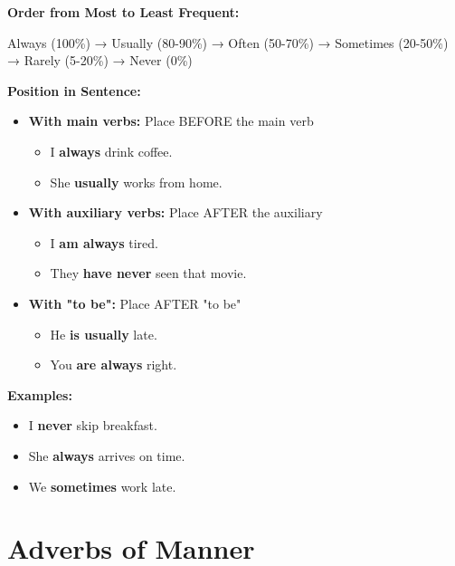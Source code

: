 \begin{grammarbox}[title=Adverbs of Frequency]
\textbf{Order from Most to Least Frequent:}
\begin{center}
Always (100\%) → Usually (80-90\%) → Often (50-70\%) → Sometimes (20-50\%) → Rarely (5-20\%) → Never (0\%)
\end{center}

\textbf{Position in Sentence:}
\begin{itemize}
    \item \textbf{With main verbs:} Place BEFORE the main verb
    \begin{itemize}
        \item I \textbf{always} drink coffee. 
        \item She \textbf{usually} works from home. 
    \end{itemize}
    \item \textbf{With auxiliary verbs:} Place AFTER the auxiliary
    \begin{itemize}
        \item I \textbf{am always} tired. 
        \item They \textbf{have never} seen that movie. 
    \end{itemize}
    \item \textbf{With "to be":} Place AFTER "to be"
    \begin{itemize}
        \item He \textbf{is usually} late. 
        \item You \textbf{are always} right. 
    \end{itemize}
\end{itemize}

\textbf{Examples:}
\begin{itemize}
    \item I \textbf{never} skip breakfast. 
    \item She \textbf{always} arrives on time. 
    \item We \textbf{sometimes} work late. 
\end{itemize}
\end{grammarbox}

\section{Adverbs of Manner}

